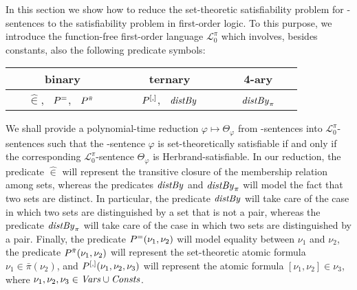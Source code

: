 \documentclass[manyauthors]{fundam}
\newcommand{\Elpizero}{\ensuremath{\mathcal{L}_{0}^{\pi}}\xspace}
\newcommand{\nonpairssym}{\bar{\pi}}
\newcommand{\nonpairs}[1]{\nonpairssym(#1)}
\begin{document}
\newcommand{\memhatP}{\widehat{\in}}
\newcommand{\memhat}[2]{#1 \memhatP #2}
\newcommand{\dist}[2]{\distS(#1,#2)}
\newcommand{\distP}[2]{\distPS(#1,#2)}
\newcommand{\distby}[3]{\distbyS(#1,#2,#3)}
\newcommand{\distPby}[4]{\distPbyS(#1,#2,#3,#4)}



In this section we show how to reduce the set-theoretic 
satisfiability problem for  \Forallpizero-sentences to the 
satisfiability problem in first-order logic. To this purpose, we 
introduce the function-free first-order language \Elpizero which 
involves, besides constants, also the following
predicate symbols:
\begin{center}
\begin{tabular}[m]{|c|c|c|}
     \hline
     binary & ternary & 4-ary \\
     \hline
~~~$\memhatP$, ~$P^{=}$, ~$P^{\bar{\pi}}$
~~~  &
%
~~~$P^{[,]}$,  ~$\mathit{distBy}$~~~ &
%
~~~$\mathit{distBy}_{\pi}$~~~\\
\hline
\end{tabular}
\end{center}


We shall provide a polynomial-time reduction $\varphi \mapsto
\Theta_{\varphi}$ from \Forallpizero-sentences into \Elpizero-sentences
such that the \Forallpizero-sentence $\varphi$ is set-theoretically
satisfiable if and only if the corresponding \Elpizero-sentence 
$\Theta_{\varphi}$ is Herbrand-satisfiable.
%
In our reduction, the predicate $\memhatP$ will represent the
transitive closure of the membership relation among sets, whereas the
predicates
$\mathit{distBy}$ and $\mathit{distBy}_{\pi}$ will model the fact that two sets are 
distinct.  In particular, the
predicate
$\mathit{distBy}$ will take care of the case in which
two sets are distinguished by a set that is not a pair,
whereas the predicate
$\mathit{distBy}_{\pi}$ will take care of the
case in which two sets are distinguished by a pair.  Finally, the predicate
$P^{=}(\nu_1,\nu_2)$ will model equality between
$\nu_1$ and $\nu_2$, the predicate $P^{\bar{\pi}}(\nu_1, \nu_2)$
will represent the set-theoretic atomic formula $\nu_1 \in \nonpairs{\nu_2}$,
and $P^{[,]}(\nu_1, \nu_2, \nu_3)$ will represent the atomic 
formula $[\nu_1, \nu_2] \in \nu_3$, where $\nu_1,\nu_2,\nu_3 \in 
\mathit{Vars} \cup \mathit{Consts}$.
\end{document}
